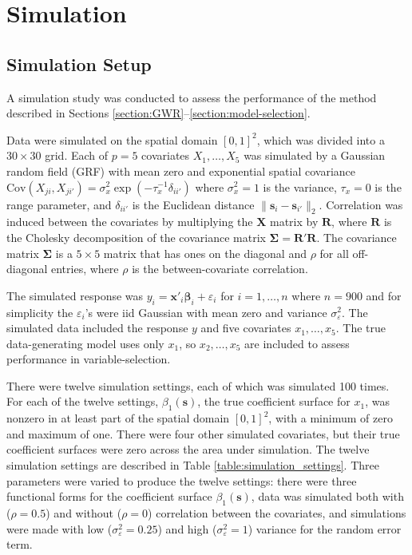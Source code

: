 \documentclass[authoryear, review, 11pt]{elsarticle}
\begin{document}
\section{Simulation \label{sec:simulation}}
	\subsection{Simulation Setup}
	A simulation study was conducted to assess the performance of the method described in Sections \ref{section:GWR}--\ref{section:model-selection}. 
	
	Data were simulated on the spatial domain $[0,1]^2$, which was divided into a $30 \times 30$ grid. Each of $p=5$ covariates $X_1, \dots, X_5$ was simulated by a Gaussian random field (GRF) with mean zero and exponential spatial covariance $\text{Cov} \left(X_{ji}, X_{ji'} \right) = \sigma_x^2 \exp{\left( -\tau_x^{-1} \delta_{ii'} \right)}$ where $\sigma_x^2=1$ is the variance, $\tau_x = 0$ is the range parameter, and $\delta_{ii'}$ is the Euclidean distance $\|\bm{s}_i - \bm{s}_{i'}\|_2$. Correlation was induced between the covariates by multiplying the $\bm{X}$ matrix by $\bm{R}$, where $\bm{R}$ is the Cholesky decomposition of the covariance matrix $\bm{\Sigma} = \bm{R}'\bm{R}$. The covariance matrix $\bm{\Sigma}$ is a $5 \times 5$ matrix that has ones on the diagonal and $\rho$ for all off-diagonal entries, where $\rho$ is the between-covariate correlation.
		
	The simulated response was $y_i = \bm{x}'_i \bm{\beta}_i + \varepsilon_i$ for $i=1, \dots, n$ where $n=900$ and for simplicity the $\varepsilon_i$'s were iid Gaussian with mean zero and variance $\sigma_\varepsilon^2$. The simulated data included the response $y$ and five covariates $x_1, \dots, x_5$. The true data-generating model uses only $x_1$, so $x_2, \dots, x_5$ are included to assess performance in variable-selection.
	
	There were twelve simulation settings, each of which was simulated 100 times. For each of the twelve settings, $\beta_1(\bm{s})$, the true coefficient surface for $x_1$, was nonzero in at least part of the spatial domain $[0,1]^2$, with a minimum of zero and maximum of one. There were four other simulated covariates, but their true coefficient surfaces were zero across the area under simulation. The twelve simulation settings are described in Table \ref{table:simulation_settings}. Three parameters were varied to produce the twelve settings: there were three functional forms for the coefficient surface $\beta_1(\bm{s})$, data was simulated both with ($\rho = 0.5$) and without ($\rho = 0$) correlation between the covariates, and simulations were made with low ($\sigma_\varepsilon^2 = 0.25$) and high ($\sigma_\varepsilon^2 = 1$) variance for the random error term.
	
\end{document}
